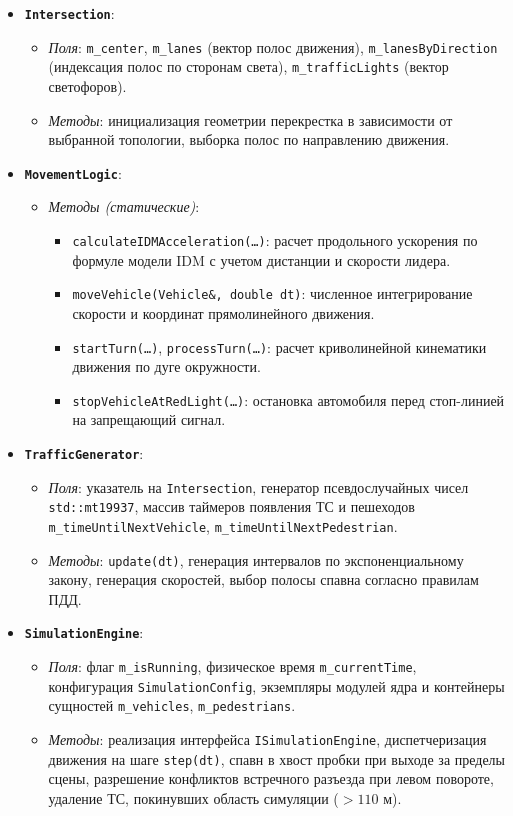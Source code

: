 \documentclass[11pt, a4paper]{article}
\begin{document}
\begin{itemize}
  \item \textbf{\texttt{Intersection}}:
  \begin{itemize}
    \item \textit{Поля}: \texttt{m\_center}, \texttt{m\_lanes} (вектор полос движения), \texttt{m\_lanesByDirection} (индексация полос по сторонам света), \texttt{m\_trafficLights} (вектор светофоров).
    \item \textit{Методы}: инициализация геометрии перекрестка в зависимости от выбранной топологии, выборка полос по направлению движения.
  \end{itemize}
  \item \textbf{\texttt{MovementLogic}}:
  \begin{itemize}
    \item \textit{Методы (статические)}:
    \begin{itemize}
      \item \texttt{calculateIDMAcceleration(\dots)}: расчет продольного ускорения по формуле модели IDM с учетом дистанции и скорости лидера.
      \item \texttt{moveVehicle(Vehicle\&, double dt)}: численное интегрирование скорости и координат прямолинейного движения.
      \item \texttt{startTurn(\dots)}, \texttt{processTurn(\dots)}: расчет криволинейной кинематики движения по дуге окружности.
      \item \texttt{stopVehicleAtRedLight(\dots)}: остановка автомобиля перед стоп-линией на запрещающий сигнал.
    \end{itemize}
  \end{itemize}
  \item \textbf{\texttt{TrafficGenerator}}:
  \begin{itemize}
    \item \textit{Поля}: указатель на \texttt{Intersection}, генератор псевдослучайных чисел \texttt{std::mt19937}, массив таймеров появления ТС и пешеходов \texttt{m\_timeUntilNextVehicle}, \texttt{m\_timeUntilNextPedestrian}.
    \item \textit{Методы}: \texttt{update(dt)}, генерация интервалов по экспоненциальному закону, генерация скоростей, выбор полосы спавна согласно правилам ПДД.
  \end{itemize}
  \item \textbf{\texttt{SimulationEngine}}:
  \begin{itemize}
    \item \textit{Поля}: флаг \texttt{m\_isRunning}, физическое время \texttt{m\_currentTime}, конфигурация \texttt{SimulationConfig}, экземпляры модулей ядра и контейнеры сущностей \texttt{m\_vehicles}, \texttt{m\_pedestrians}.
    \item \textit{Методы}: реализация интерфейса \texttt{ISimulationEngine}, диспетчеризация движения на шаге \texttt{step(dt)}, спавн в хвост пробки при выходе за пределы сцены, разрешение конфликтов встречного разъезда при левом повороте, удаление ТС, покинувших область симуляции ($> 110\text{ м}$).
  \end{itemize}
\end{itemize}
\end{document}
